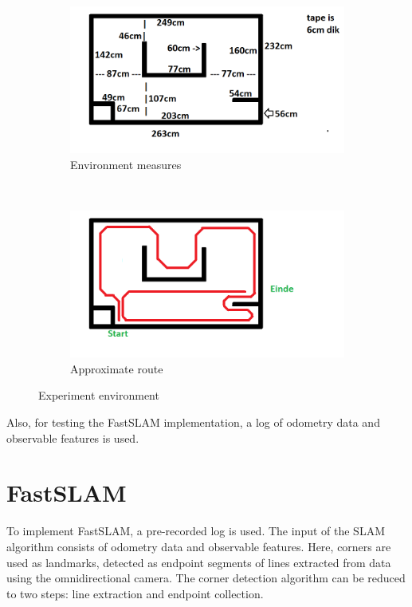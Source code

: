 \documentclass[12pt]{article}
\begin{document}
\begin{figure}[H]
	\centering
	\begin{subfigure}[b]{0.48\textwidth}
		\includegraphics[width=\textwidth]{layout.png}
		\caption{Environment measures}
	\end{subfigure}
	~
	\begin{subfigure}[b]{0.48\textwidth}
		\includegraphics[width=\textwidth]{route.png}
		\caption{Approximate route}
	\end{subfigure}
	\caption{Experiment environment}
\end{figure}

Also, for testing the FastSLAM implementation, a log of odometry data and observable features is used.

\section{FastSLAM}
To implement FastSLAM, a pre-recorded log is used. The input of the SLAM algorithm consists of odometry data and observable features. Here, corners are used as landmarks, detected as endpoint segments of lines extracted from data using the omnidirectional camera. The corner detection algorithm can be reduced to two steps: line extraction and endpoint collection.
\end{document}
